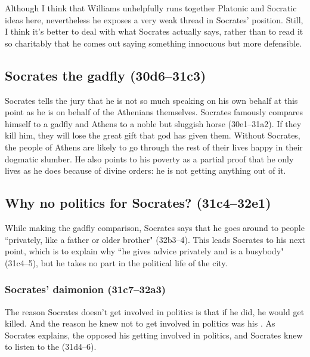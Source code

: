 \documentclass[11pt]{article}
\begin{document}
Although I think that Williams unhelpfully runs together Platonic and Socratic
ideas here, nevertheless he exposes a very weak thread in Socrates' position.
Still, I think it's better to deal with what Socrates actually says, rather
than to read it so charitably that he comes out saying something innocuous but
more defensible.


\subsection{Socrates the gadfly (30d6--31c3)}

Socrates tells the jury that he is not so much speaking on his own behalf at
this point as he is on behalf of the Athenians themselves.  Socrates famously
compares himself to a gadfly and Athens to a noble but sluggish horse
(30e1--31a2).  If they kill him, they will lose the great gift that god has
given them.  Without Socrates, the people of Athens are likely to go through
the rest of their lives happy in their dogmatic slumber.  He also points to his
poverty as a partial proof that he only lives as he does because of divine
orders: he is not getting anything out of it.


\subsection{Why no politics for Socrates? (31c4--32e1)}

While making the gadfly comparison, Socrates says that he goes around to people
``privately, like a father or older brother" (32b3--4).  This leads Socrates to
his next point, which is to explain why ``he gives advice privately and is
a busybody" (31c4--5), but he takes no part in the political life of the city.


\subsubsection{Socrates' daimonion (31c7--32a3)}

The reason Socrates doesn't get involved in politics is that if he did, he
would get killed.  And the reason he knew not to get involved in politics was
his .  As Socrates explains, the  opposed
his getting involved in politics, and Socrates knew to listen to the
 (31d4--6).
\end{document}
